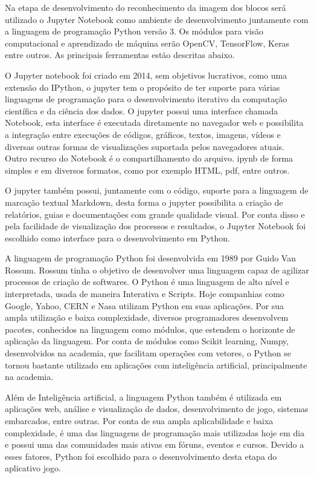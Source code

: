         Na etapa de desenvolvimento do reconhecimento da imagem dos blocos será utilizado o Jupyter Notebook como ambiente de desenvolvimento juntamente com a linguagem de programação Python versão 3. Os módulos para visão computacional e aprendizado de máquina serão OpenCV, TensorFlow, Keras entre outros. As principais ferramentas estão descritas abaixo.
        
    

        O Jupyter notebook foi criado em 2014, sem objetivos lucrativos, como uma extensão do IPython, o jupyter tem o propósito de ter suporte para várias linguagens de programação para o desenvolvimento iterativo da computação científica e da ciência dos dados. O jupyter possui uma interface chamada Notebook, esta interface é executada diretamente no navegador web e possibilita a integração entre  execuções de códigos, gráficos, textos, imagens, vídeos e diversas outras formas de visualizações suportada pelos navegadores atuais. Outro recurso do Notebook é o compartilhamento do arquivo. ipynb de forma simples e em diversos formatos, como por exemplo HTML, pdf, entre outros.
        
    	O jupyter também possui, juntamente com o código, suporte para a linguagem de marcação textual Markdown, desta forma o jupyter possibilita a criação de relatórios, guias e documentações com grande qualidade visual.  Por conta disso e pela facilidade de visualização dos processos e resultados, o Jupyter Notebook foi escolhido como interface para o desenvolvimento em Python. 
            
        A linguagem de programação Python foi desenvolvida em 1989 por Guido Van Rossum. Rossum tinha o objetivo de desenvolver uma linguagem capaz de agilizar processos de criação de softwares. 
    	O Python é uma linguagem de alto nível e interpretada, usada de maneira Interativa e Scripts. Hoje companhias como Google, Yahoo, CERN e Nasa utilizam Python em suas aplicações. Por sua ampla utilização e baixa complexidade, diversos programadores desenvolvem pacotes, conhecidos na linguagem como módulos, que estendem o horizonte de aplicação da linguagem. Por conta de módulos como Scikit learning, Numpy, desenvolvidos na academia, que facilitam operações com vetores, o Python se tornou bastante utilizado em aplicações com inteligência artificial,  principalmente na academia.
    	
        Além de Inteligência artificial, a linguagem Python também é utilizada em aplicações web, análise e visualização de dados, desenvolvimento de jogo, sistemas embarcados, entre outras. Por conta de sua ampla aplicabilidade e baixa complexidade,  é uma das linguagens de programação mais utilizadas hoje em dia e possui uma das comunidades mais ativas em fóruns, eventos e cursos. Devido a esses fatores, Python foi escolhido para o desenvolvimento desta etapa do aplicativo jogo.  
            
